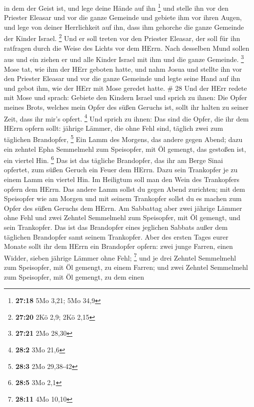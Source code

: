 in dem der Geist ist, und lege deine Hände auf ihn \footnote{\textbf{27:18}
  5Mo 3,21; 5Mo 34,9}  und stelle ihn vor den Priester
Eleasar und vor die ganze Gemeinde und gebiete ihm vor ihren Augen,
 und lege von deiner Herrlichkeit auf ihn, dass ihm
gehorche die ganze Gemeinde der Kinder Israel. \footnote{\textbf{27:20}
  2Kö 2,9; 2Kö 2,15}  Und er soll treten vor den Priester
Eleasar, der soll für ihn ratfragen durch die Weise des Lichts vor dem
HErrn. Nach desselben Mund sollen aus und ein ziehen er und alle Kinder
Israel mit ihm und die ganze Gemeinde. \footnote{\textbf{27:21} 2Mo
  28,30}  Mose tat, wie ihm der HErr geboten hatte, und
nahm Josua und stellte ihn vor den Priester Eleasar und vor die ganze
Gemeinde  und legte seine Hand auf ihn und gebot ihm, wie
der HErr mit Mose geredet hatte. \# 28  Und der HErr redete
mit Mose und sprach:  Gebiete den Kindern Israel und sprich
zu ihnen: Die Opfer meines Brots, welches mein Opfer des süßen Geruchs
ist, sollt ihr halten zu seiner Zeit, dass ihr mir's opfert. \footnote{\textbf{28:2}
  3Mo 21,6}  Und sprich zu ihnen: Das sind die Opfer, die
ihr dem HErrn opfern sollt: jährige Lämmer, die ohne Fehl sind, täglich
zwei zum täglichen Brandopfer, \footnote{\textbf{28:3} 2Mo 29,38-42}
 Ein Lamm des Morgens, das andere gegen Abend; 
dazu ein zehntel Epha Semmelmehl zum Speisopfer, mit Öl gemengt, das
gestoßen ist, ein viertel Hin. \footnote{\textbf{28:5} 3Mo 2,1}
 Das ist das tägliche Brandopfer, das ihr am Berge Sinai
opfertet, zum süßen Geruch ein Feuer dem HErrn.  Dazu sein
Trankopfer je zu einem Lamm ein viertel Hin. Im Heiligtum soll man den
Wein des Trankopfers opfern dem HErrn.  Das andere Lamm
sollst du gegen Abend zurichten; mit dem Speisopfer wie am Morgen und
mit seinem Trankopfer sollst du es machen zum Opfer des süßen Geruchs
dem HErrn.  Am Sabbattag aber zwei jährige Lämmer ohne Fehl
und zwei Zehntel Semmelmehl zum Speisopfer, mit Öl gemengt, und sein
Trankopfer.  Das ist das Brandopfer eines jeglichen Sabbats
außer dem täglichen Brandopfer samt seinem Trankopfer. 
Aber des ersten Tages eurer Monate sollt ihr dem HErrn ein Brandopfer
opfern: zwei junge Farren, einen Widder, sieben jährige Lämmer ohne
Fehl; \footnote{\textbf{28:11} 4Mo 10,10}  und je drei
Zehntel Semmelmehl zum Speisopfer, mit Öl gemengt, zu einem Farren; und
zwei Zehntel Semmelmehl zum Speisopfer, mit Öl gemengt, zu dem einen
